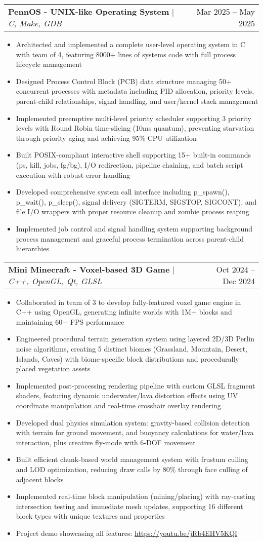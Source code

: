 \documentclass[letterpaper,11pt]{article}
\makeatletter
\newcommand{\resumeItem}[1]{
  \item\small{
    {#1 \vspace{-3pt}}
  }
}
\newcommand{\resumeProjectHeading}[2]{
    \item
    \begin{tabular*}{0.97\textwidth}{l@{\extracolsep{\fill}}r}
      \small#1 & #2 \\
    \end{tabular*}\vspace{-7pt}
}
\newcommand{\resumeItemListStart}{\begin{itemize}}
\newcommand{\resumeItemListEnd}{\end{itemize}\vspace{-5pt}}
\makeatother
\begin{document}
    \resumeProjectHeading
        {\textbf{PennOS - UNIX-like Operating System} $|$ \emph{C, Make, GDB}}{Mar 2025 -- May 2025}
        \resumeItemListStart
        \resumeItem{Architected and implemented a complete user-level operating system in C with team of 4, featuring 8000+ lines of systems code with full process lifecycle management}
        \resumeItem{Designed Process Control Block (PCB) data structure managing 50+ concurrent processes with metadata including PID allocation, priority levels, parent-child relationships, signal handling, and user/kernel stack management}
        \resumeItem{Implemented preemptive multi-level priority scheduler supporting 3 priority levels with Round Robin time-slicing (10ms quantum), preventing starvation through priority aging and achieving 95\% CPU utilization}
        \resumeItem{Built POSIX-compliant interactive shell supporting 15+ built-in commands (ps, kill, jobs, fg/bg), I/O redirection, pipeline chaining, and batch script execution with robust error handling}
        \resumeItem{Developed comprehensive system call interface including p\_spawn(), p\_wait(), p\_sleep(), signal delivery (SIGTERM, SIGSTOP, SIGCONT), and file I/O wrappers with proper resource cleanup and zombie process reaping}
        \resumeItem{Implemented job control and signal handling system supporting background process management and graceful process termination across parent-child hierarchies}
        \resumeItemListEnd
          
    \resumeProjectHeading
          {\textbf{Mini Minecraft - Voxel-based 3D Game} $|$ \emph{C++, OpenGL, Qt, GLSL}}{Oct 2024 -- Dec 2024}
          \resumeItemListStart
          \resumeItem{Collaborated in team of 3 to develop fully-featured voxel game engine in C++ using OpenGL, generating infinite worlds with 1M+ blocks and maintaining 60+ FPS performance}
          \resumeItem{Engineered procedural terrain generation system using layered 2D/3D Perlin noise algorithms, creating 5 distinct biomes (Grassland, Mountain, Desert, Islands, Caves) with biome-specific block distributions and procedurally placed vegetation assets}
          \resumeItem{Implemented post-processing rendering pipeline with custom GLSL fragment shaders, featuring dynamic underwater/lava distortion effects using UV coordinate manipulation and real-time crosshair overlay rendering}
          \resumeItem{Developed dual physics simulation system: gravity-based collision detection with terrain for ground movement, and buoyancy calculations for water/lava interaction, plus creative fly-mode with 6-DOF movement}
          \resumeItem{Built efficient chunk-based world management system with frustum culling and LOD optimization, reducing draw calls by 80\% through face culling of adjacent blocks}
          \resumeItem{Implemented real-time block manipulation (mining/placing) with ray-casting intersection testing and immediate mesh updates, supporting 16 different block types with unique textures and properties}
          \resumeItem{Project demo showcasing all features: \url{https://youtu.be/jRb4EHV5KQI}}
          \resumeItemListEnd
          
\end{document}
